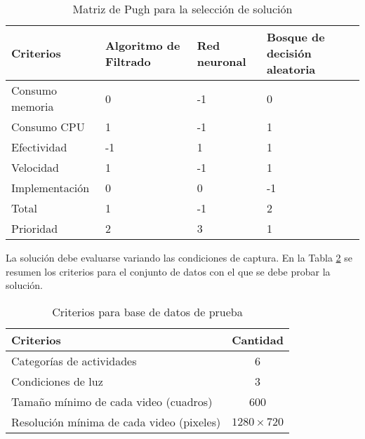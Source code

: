 \begin{table} [!h]
    \caption{Matriz de Pugh para la selección de solución}
    \label{tab:sel_sol}
    \centering
    \begin{tabular}{p{3.5 cm} p{2.5 cm} p{2.5 cm} p{3.5 cm}}
        \hline
        Criterios & Algoritmo de Filtrado & Red neuronal & Bosque de decisión aleatoria \\
        \hline
        Consumo memoria & 0 & -1 & 0 \\
        Consumo CPU & 1 & -1 & 1 \\
        Efectividad & -1 & 1 & 1 \\
        Velocidad & 1 & -1 & 1 \\
        Implementación & 0 & 0 & -1 \\
        \hline
        Total & 1 & -1 & 2 \\
        \hline
        Prioridad & 2 & 3 & 1 \\
        \hline
    \end{tabular}
\end{table}

\newpage

La solución debe evaluarse variando las condiciones de captura. En la Tabla \ref{tab:base_de_datos} se resumen los criterios para el conjunto de datos con el que se debe probar la solución.

\begin{table} [!h]
    \caption{Criterios para base de datos de prueba}
    \label{tab:base_de_datos}
    \centering
    \begin{tabular}{l c}
        \hline
        Criterios & Cantidad \\
        \hline
        Categorías de actividades & 6 \\
        Condiciones de luz & 3 \\
        Tamaño mínimo de cada video (cuadros) & 600 \\
        Resolución mínima de cada video (pixeles) & $1280 \times 720$ \\
        \hline
    \end{tabular}
\end{table}
